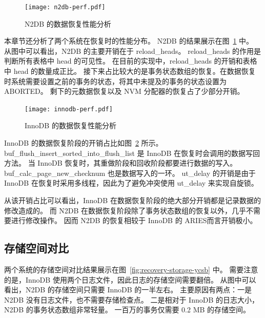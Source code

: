 \begin{figure}
    \centering
    \texttt{[image: n2db-perf.pdf]}
    \caption{N2DB 的数据恢复性能分析}
    \label{fig:recovery-n2db-perf}
\end{figure}

本章节还分析了两个系统在恢复时的性能分布。
N2DB 的结果展示在图~\ref{fig:recovery-n2db-perf} 中。
从图中可以看出，N2DB 的主要开销在于 reload\_heads。
reload\_heads 的作用是判断所有表格中 head 的可见性。
在目前的实现中，reload\_heads 的开销和表格中 head 的数量成正比。
接下来占比较大的是事务状态数组的恢复。在数据恢复时系统需要设置之前的事务的状态，将其中未提及的事务的状态设置为 ABORTED。
剩下的元数据恢复以及 NVM 分配器的恢复占了少部分开销。

\begin{figure}
    \centering
    \texttt{[image: innodb-perf.pdf]}
    \caption{InnoDB 的数据恢复性能分析}
    \label{fig:recovery-innodb-perf}
\end{figure}


InnoDB 的数据恢复阶段的开销占比如图~\ref{fig:recovery-innodb-perf} 所示。
buf\_flush\_insert\_sorted\_into\_flush\_list 是 InnoDB 在恢复时会调用的数据写回方法。
当 InnoDB 恢复时，其重做阶段和回收阶段都要进行数据的写入。
buf\_calc\_page\_new\_checknum 也是数据写入的一环。
ut\_delay 的开销是由于 InnoDB 在恢复时采用多线程，因此为了避免冲突使用 ut\_delay 来实现自旋锁。

从该开销占比可以看出，InnoDB 在数据恢复阶段的绝大部分开销都是记录数据的修改造成的。
而 N2DB 在数据恢复阶段除了事务状态数组的恢复以外，几乎不需要进行修改操作。
因而 N2DB 的恢复相较于 InnoDB 的 ARIES而言开销极小。








\subsection{存储空间对比}

两个系统的存储空间对比结果展示在图~\ref{fig:recovery-storage-ycsb} 中。
需要注意的是，InnoDB 使用两个日志文件，因此日志的存储空间需要翻倍。
从图中可以看出，N2DB 的存储空间只需要 InnoDB 的一半左右。
主要原因有两点：一是 N2DB 没有日志文件，也不需要存储检查点。
二是相对于 InnoDB 的日志大小，N2DB 的事务状态数组非常轻量。
一百万的事务仅需要 0.2 MB 的存储空间。

